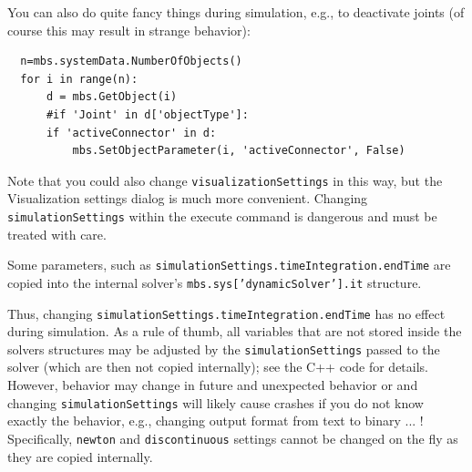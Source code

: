 \noindent You can also do quite fancy things during simulation, e.g., to deactivate joints (of course this may result in strange behavior):
\pythonstyle\begin{lstlisting}
  n=mbs.systemData.NumberOfObjects()
  for i in range(n):
      d = mbs.GetObject(i)
      #if 'Joint' in d['objectType']:
      if 'activeConnector' in d:
          mbs.SetObjectParameter(i, 'activeConnector', False)
\end{lstlisting}


Note that you could also change \texttt{visualizationSettings} in this way, but the Visualization settings dialog is much more convenient.
Changing \texttt{simulationSettings} within the execute command is dangerous and must be treated with care.

Some parameters, such as \texttt{simulationSettings.timeIntegration.endTime} are copied into the internal solver's \texttt{mbs.sys['dynamicSolver'].it} structure.

Thus, changing \texttt{simulationSettings.timeIntegration.endTime} has no effect during simulation. 
As a rule of thumb, all variables that are not stored inside the solvers structures may be adjusted by the \texttt{simulationSettings} passed to the solver (which are then not copied internally); see the C++ code for details. However, behavior may change in future and unexpected behavior or and changing \texttt{simulationSettings} will likely cause crashes if you do not know exactly the behavior, e.g., changing output format from text to binary ... !
Specifically, \texttt{newton} and \texttt{discontinuous} settings cannot be changed on the fly as they are copied internally.

